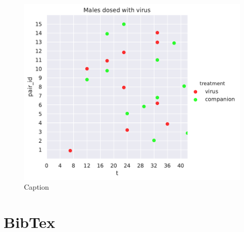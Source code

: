 \documentclass[11pt,letterpaper]{scrartcl}
\begin{document}
\begin{figure}[h]
\centering
\includegraphics[width=\textwidth]{tm.pdf}
\caption{Caption}
\label{fig:tf}
\end{figure}

\section{BibTex}
\end{document}
